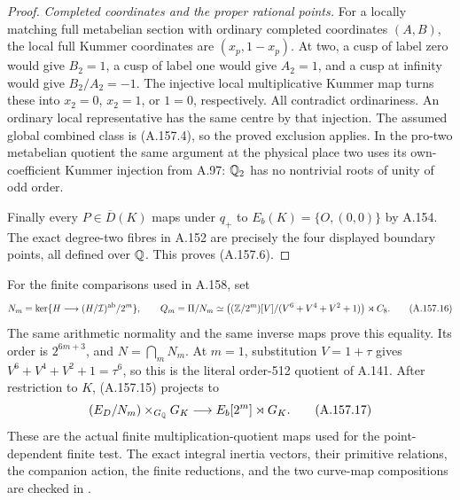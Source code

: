 \begin{proof}
\emph{Completed coordinates and the proper rational points.}
For a locally matching full metabelian section with
ordinary completed coordinates \((A,B)\), the local
full Kummer coordinates are \((x_p,1-x_p)\).
At two, a cusp of label zero would give \(B_2=1\),
a cusp of label one would give \(A_2=1\), and a
cusp at infinity would give \(B_2/A_2=-1\).
The injective local multiplicative Kummer map turns
these into \(x_2=0\), \(x_2=1\), or \(1=0\),
respectively.  All contradict ordinariness.
An ordinary local representative has the same centre
by that injection.  The assumed global combined
class is (A.157.4), so the proved exclusion applies.
In the pro-two metabelian quotient the same argument
at the physical place two uses its own-coefficient
Kummer injection from A.97: \(\mathbb Q_2\) has no
nontrivial roots of unity of odd order.

Finally every \(P\in\overline D(K)\) maps under
\(q_+\) to \(E_b(K)=\{O,(0,0)\}\) by A.154.
The exact degree-two fibres in A.152 are precisely
the four displayed boundary points, all defined
over \(\mathbb Q\).  This proves (A.157.6).
\end{proof}

For the finite comparisons used in A.158, set
\[
 N_m=\ker\{H\longrightarrow(H/\mathcal I)^{\rm ab}/2^m\},
 \qquad
 Q_m=\Pi/N_m\simeq
 \bigl((\mathbb Z/2^m)[V]/(V^6+V^4+V^2+1)\bigr)\rtimes C_8.
\tag{A.157.16}
\]
The same arithmetic normality and the same inverse maps
prove this equality.  Its order is \(2^{6m+3}\),
and \(N=\bigcap_mN_m\).  At \(m=1\), substitution
\(V=1+\tau\) gives \(V^6+V^4+V^2+1=\tau^6\),
so this is the literal order-512 quotient of A.141.
After restriction to \(K\), (A.157.15) projects to
\[
       (E_D/N_m)\times_{G_\mathbb Q}G_K
                       \longrightarrow E_b[2^m]\rtimes G_K.
\tag{A.157.17}
\]
These are the actual finite multiplication-quotient
maps used for the point-dependent finite test.
The exact integral inertia vectors, their primitive
relations, the companion action, the finite reductions,
and the two curve-map compositions are checked in
.
